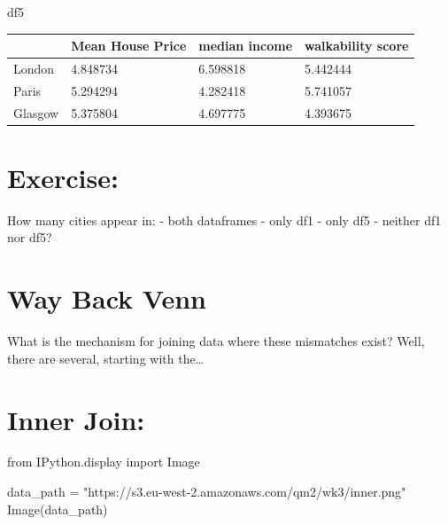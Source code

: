 \documentclass[
  letterpaper,
  DIV=11,
  numbers=noendperiod]{scrreprt}
\newenvironment{Shaded}{\begin{snugshade}}{\end{snugshade}}
\newcommand{\ImportTok}[1]{\textcolor[rgb]{0.00,0.46,0.62}{#1}}
\newcommand{\NormalTok}[1]{\textcolor[rgb]{0.00,0.23,0.31}{#1}}
\newcommand{\OperatorTok}[1]{\textcolor[rgb]{0.37,0.37,0.37}{#1}}
\newcommand{\StringTok}[1]{\textcolor[rgb]{0.13,0.47,0.30}{#1}}
\begin{document}
\begin{Shaded}
\begin{Highlighting}[]
\NormalTok{df5}
\end{Highlighting}
\end{Shaded}

\begin{longtable}[]{@{}llll@{}}
\toprule\noalign{}
& Mean House Price & median income & walkability score \\
\midrule\noalign{}
\endhead
\bottomrule\noalign{}
\endlastfoot
London & 4.848734 & 6.598818 & 5.442444 \\
Paris & 5.294294 & 4.282418 & 5.741057 \\
Glasgow & 5.375804 & 4.697775 & 4.393675 \\
\end{longtable}

\hypertarget{exercise-13}{%
\section{Exercise:}\label{exercise-13}}

How many cities appear in: - both dataframes - only df1 - only df5 -
neither df1 nor df5?

\hypertarget{way-back-venn}{%
\section{Way Back Venn}\label{way-back-venn}}

What is the mechanism for joining data where these mismatches exist?
Well, there are several, starting with the\ldots{}

\hypertarget{inner-join}{%
\section{Inner Join:}\label{inner-join}}

\begin{Shaded}
\begin{Highlighting}[]
\ImportTok{from}\NormalTok{ IPython.display }\ImportTok{import}\NormalTok{ Image}

\NormalTok{data\_path }\OperatorTok{=} \StringTok{"https://s3.eu{-}west{-}2.amazonaws.com/qm2/wk3/inner.png"}
\NormalTok{Image(data\_path)}
\end{Highlighting}
\end{Shaded}
\end{document}
